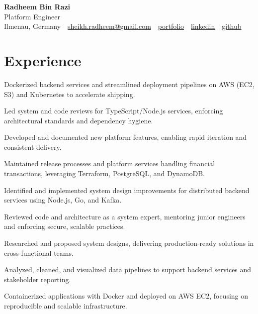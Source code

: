 \documentclass[11pt,a4paper]{resume}
\makeatletter
\newcommand{\Portfolio}{https://radheem.github.io/my-cv}
\newcommand{\PortfolioText}{portfolio}
\newcommand{\GitHub}{https://github.com/radheem}
\newcommand{\LinkedIn}{https://www.linkedin.com/in/radheem-razi}
\newcommand{\Email}{sheikh.radheem@gmail.com}
\makeatother
\begin{document}
\begin{center}
  {\huge\bfseries Radheem Bin Razi}\\[3pt]
  {\large Platform Engineer}\\[6pt]
  \small
  Ilmenau, Germany \,\textbar\,
  \href{mailto:\Email}{\Email} \,\textbar\,
  \href{\Portfolio}{\PortfolioText} \,\textbar\,
  \href{\LinkedIn}{linkedin} \,\textbar\,
  \href{\GitHub}{github}
\end{center}
\vspace{2pt}

\section{Experience}

\bullets
  \item Dockerized backend services and streamlined deployment pipelines on AWS (EC2, S3) and Kubernetes to accelerate shipping.
  \item Led system and code reviews for TypeScript/Node.js services, enforcing architectural standards and dependency hygiene.
  \item Developed and documented new platform features, enabling rapid iteration and consistent delivery.
\bulletsend
\vspace{3pt}
\bullets
  \item Maintained release processes and platform services handling financial transactions, leveraging Terraform, PostgreSQL, and DynamoDB.
  \item Identified and implemented system design improvements for distributed backend services using Node.js, Go, and Kafka.
  \item Reviewed code and architecture as a system expert, mentoring junior engineers and enforcing secure, scalable practices.
\bulletsend
\vspace{3pt}
\bullets
  \item Researched and proposed system designs, delivering production-ready solutions in cross-functional teams.
  \item Analyzed, cleaned, and visualized data pipelines to support backend services and stakeholder reporting.
  \item Containerized applications with Docker and deployed on AWS EC2, focusing on reproducible and scalable infrastructure.
\bulletsend
\vspace{3pt}
\end{document}

